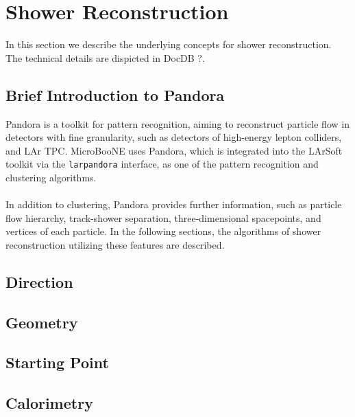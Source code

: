 \section{Shower Reconstruction}

In this section we describe the underlying concepts for shower reconstruction.
The technical details are dispicted in DocDB ?.

\subsection{Brief Introduction to Pandora}

Pandora is a toolkit for pattern recognition, aiming to 
reconstruct particle flow in detectors with fine granularity, such as
detectors of high-energy lepton colliders, and LAr TPC.
MicroBooNE uses Pandora, which is integrated into the LArSoft toolkit
via the \texttt{larpandora} interface,
as one of the pattern recognition and clustering algorithms. \\
\\
In addition to clustering, Pandora provides further information, such
as particle flow hierarchy, track-shower separation, three-dimensional
spacepoints, and vertices of each particle.
In the following sections, the algorithms of shower reconstruction 
utilizing these features are described.

\subsection{Direction}


\subsection{Geometry}

\subsection{Starting Point}

\subsection{Calorimetry}

